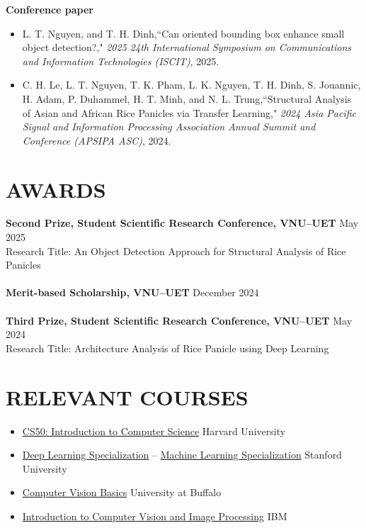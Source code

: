 \documentclass[a4paper,9pt]{extarticle}
\newcommand{\colormyname}[1]{\textcolor{myred}{#1}}
\begin{document}
\noindent
\textbf{Conference paper}
\begin{itemize}[itemsep=3pt]
    \item \colormyname{L. T. Nguyen}, and T. H. Dinh,``Can oriented bounding box enhance small object detection?," \textit{2025 24th International Symposium on Communications and Information Technologies (ISCIT)}, 2025.
    \item C. H. Le, \colormyname{L. T. Nguyen}, T. K. Pham, L. K. Nguyen, T. H. Dinh, S. Jouannic, H. Adam, P. Duhammel, H. T. Minh, and N. L. Trung,``Structural Analysis of Asian and African Rice Panicles via Transfer Learning," \textit{2024 Asia Pacific Signal and Information Processing Association Annual Summit and Conference (APSIPA ASC)}, 2024.
\end{itemize}

\section*{AWARDS}
\textbf{Second Prize, Student Scientific Research Conference, VNU--UET} \hfill May 2025\\ 
Research Title: An Object Detection Approach for Structural Analysis of Rice Panicles \\ \\
\textbf{Merit-based Scholarship, VNU--UET} \hfill  December 2024 \\ \\
\textbf{Third Prize, Student Scientific Research Conference, VNU--UET} \hfill May 2024\\ 
Research Title: Architecture Analysis of Rice Panicle using Deep Learning 

\section*{RELEVANT COURSES}
\begin{itemize}
    \item \href{https://certificates.cs50.io/3f3f35e9-bda6-4487-84a3-2d11b3706bba.pdf?size=letter}{CS50: Introduction to Computer Science} \hfill Harvard University
    \item \href{https://www.credly.com/badges/6dfef240-b0c0-423f-9c94-897d0940c790/public_url}{Deep Learning Specialization} -- \href{https://www.coursera.org/account/accomplishments/specialization/N234W2TA9VF3}{Machine Learning Specialization} \hfill Stanford University
    \item \href{https://www.coursera.org/account/accomplishments/certificate/L9TKVLPXS79W}{Computer Vision Basics} \hfill University at Buffalo
    \item \href{https://www.credly.com/go/GHFkiYLI}{Introduction to Computer Vision and Image Processing} \hfill IBM
\end{itemize}
\end{document}
